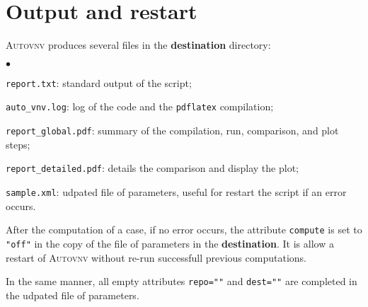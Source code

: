 \documentclass[a4paper,10pt,twoside]{article}
\begin{document}
\section{Output and restart}\label{sec:restart}

\textsc{Autovnv} produces several files in the \textbf{destination} directory:
\begin{list}{$\bullet$}{}
\item \texttt{report.txt}: standard output of the script;
\item \texttt{auto\_vnv.log}: log of the code and the \texttt{pdflatex}
compilation;
\item \texttt{report\_global.pdf}: summary of the compilation, run, comparison,
and plot steps;
\item \texttt{report\_detailed.pdf}: details the comparison and display the
plot;
\item \texttt{sample.xml}: udpated file of parameters, useful for restart the
script if an error occurs.
\end{list}

After the computation of a case, if no error occurs, the attribute
\texttt{compute}
is set to \texttt{"off"} in the copy of the file of parameters in
the \textbf{destination}. It is allow a restart
of \textsc{Autovnv} without re-run successfull previous computations.

In the same manner, all empty attributes \texttt{repo=""} and \texttt{dest=""}
are completed in the udpated file of parameters.
\end{document}
